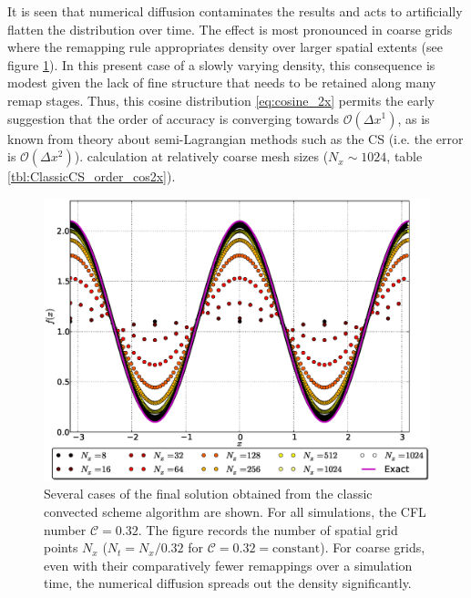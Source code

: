 \documentclass[11pt,titlepage]{report}
\begin{document}
\begin{table}
{{\begin{minipage}{0.65\hsize}
\captionsetup{width=0.75\hsize}  
 \label{fig:ClassicCS_cos2x}
\end{minipage}
}}
\end{table}

It is seen that numerical diffusion contaminates the results and acts to artificially flatten the distribution over time. The effect is most pronounced in coarse grids where the remapping rule appropriates density over larger spatial extents (see figure \ref{fig:ClassicCS_cos2x_several_cases}). In this present case of a slowly varying density, this consequence is modest given the lack of fine structure that needs to be retained along many remap stages. Thus, this cosine distribution \eqref{eq:cosine_2x} permits the early suggestion that the order of accuracy is converging towards $\mathcal{O}(\Delta x^1)$, as is known from theory about semi-Lagrangian methods such as the CS \cite{Besse08} (i.e. the error is $\mathcal{O}(\Delta x^2)$). calculation at relatively coarse mesh sizes ($N_x \sim 1024$, table \ref{tbl:ClassicCS_order_cos2x}).

\begin{figure}[h!]
 \centering
   \includegraphics[width=\textwidth]{graphics/plot_-_ClassicCS_cosine2x_Nxall.eps}
 \caption{Several cases of the final solution obtained from the classic convected scheme algorithm are shown. For all simulations, the CFL number $\mathcal{C} = 0.32$. The figure records the number of spatial grid points $N_x$ ($N_t = N_x / 0.32$ for $\mathcal{C} = 0.32 = \text{constant}$). For coarse grids, even with their comparatively fewer remappings over a simulation time, the numerical diffusion spreads out the density significantly.}
 \label{fig:ClassicCS_cos2x_several_cases}
\end{figure}
\end{document}
